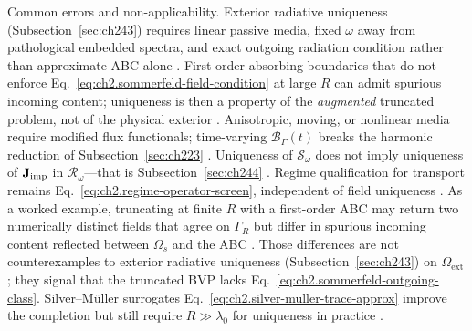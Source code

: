 Common errors and non-applicability. Exterior radiative uniqueness (Subsection~\ref{sec:ch243}) requires linear passive media,
fixed \(\omega\) away from pathological embedded spectra, and exact outgoing radiation condition
rather than approximate ABC alone \cite{stratton1941}. First-order
absorbing boundaries that do not enforce Eq.~\eqref{eq:ch2.sommerfeld-field-condition}
at large \(R\) can admit spurious incoming content; uniqueness is then a property of
the \emph{augmented} truncated problem, not of the physical exterior
\cite{harrington2001}. Anisotropic, moving, or nonlinear media require modified flux
functionals; time-varying \(\mathcal{B}_\Gamma(t)\) breaks the harmonic reduction of
Subsection~\ref{sec:ch223} \cite{stratton1941}. Uniqueness of \(\mathcal{S}_\omega\)
does not imply uniqueness of \(\mathbf{J}_{\mathrm{imp}}\) in \(\mathcal{R}_\omega\)---that is
Subsection~\ref{sec:ch244} \cite{harrington2001}. Regime qualification for transport
remains Eq.~\eqref{eq:ch2.regime-operator-screen}, independent of field uniqueness
\cite{stratton1941}.
As a worked example, truncating at finite \(R\) with a first-order ABC may return two numerically distinct
fields that agree on \(\Gamma_R\) but differ in spurious incoming content reflected
between \(\Omega_s\) and the ABC \cite{harrington2001}. Those differences are not
counterexamples to exterior radiative uniqueness (Subsection~\ref{sec:ch243}) on
\(\Omega_{\mathrm{ext}}\); they signal that the truncated BVP lacks
Eq.~\eqref{eq:ch2.sommerfeld-outgoing-class}. Silver--Müller surrogates
Eq.~\eqref{eq:ch2.silver-muller-trace-approx} improve the completion but still require
\(R\gg\lambda_0\) for uniqueness in practice \cite{stratton1941}.
